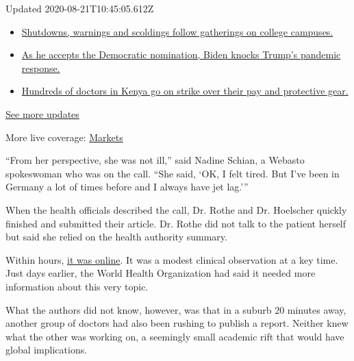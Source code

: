 Updated 2020-08-21T10:45:05.612Z

\begin{itemize}
\tightlist
\item
  \href{https://www.nytimes3xbfgragh.onion/2020/08/21/world/covid-19-coronavirus.html?action=click\&pgtype=Article\&state=default\&region=MAIN_CONTENT_1\&context=storylines_live_updates\#link-4690b6aa}{Shutdowns,
  warnings and scoldings follow gatherings on college campuses.}
\item
  \href{https://www.nytimes3xbfgragh.onion/2020/08/21/world/covid-19-coronavirus.html?action=click\&pgtype=Article\&state=default\&region=MAIN_CONTENT_1\&context=storylines_live_updates\#link-324af071}{As
  he accepts the Democratic nomination, Biden knocks Trump's pandemic
  response.}
\item
  \href{https://www.nytimes3xbfgragh.onion/2020/08/21/world/covid-19-coronavirus.html?action=click\&pgtype=Article\&state=default\&region=MAIN_CONTENT_1\&context=storylines_live_updates\#link-35890b73}{Hundreds
  of doctors in Kenya go on strike over their pay and protective gear.}
\end{itemize}

\href{https://www.nytimes3xbfgragh.onion/2020/08/21/world/covid-19-coronavirus.html?action=click\&pgtype=Article\&state=default\&region=MAIN_CONTENT_1\&context=storylines_live_updates}{See
more updates}

More live coverage:
\href{https://www.nytimes3xbfgragh.onion/live/2020/08/20/business/stock-market-today-coronavirus?action=click\&pgtype=Article\&state=default\&region=MAIN_CONTENT_1\&context=storylines_live_updates}{Markets}

``From her perspective, she was not ill,'' said Nadine Schian, a Webasto
spokeswoman who was on the call. ``She said, `OK, I felt tired. But I've
been in Germany a lot of times before and I always have jet lag.'''

When the health officials described the call, Dr. Rothe and Dr.
Hoelscher quickly finished and submitted their article. Dr. Rothe did
not talk to the patient herself but said she relied on the health
authority summary.

Within hours,
\href{https://www.nejm.org/doi/full/10.1056/NEJMc2001468}{it was
online}. It was a modest clinical observation at a key time. Just days
earlier, the World Health Organization had said it needed more
information about this very topic.

What the authors did not know, however, was that in a suburb 20 minutes
away, another group of doctors had also been rushing to publish a
report. Neither knew what the other was working on, a seemingly small
academic rift that would have global implications.

